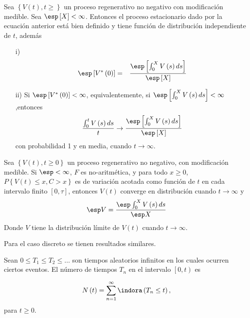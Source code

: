 \begin{Teo}
Sea $\left\{V\left(t\right),t\geq\right\}$ un proceso regenerativo no negativo con modificaci\'on medible. Sea $\esp\left[X\right]<\infty$. Entonces el proceso estacionario dado por la ecuaci\'on anterior est\'a bien definido y tiene funci\'on de distribuci\'on independiente de $t$, adem\'as
\begin{itemize}
\item[i)] \begin{eqnarray*}
\esp\left[V^{*}\left(0\right)\right]&=&\frac{\esp\left[\int_{0}^{X}V\left(s\right)ds\right]}{\esp\left[X\right]}\end{eqnarray*}
\item[ii)] Si $\esp\left[V^{*}\left(0\right)\right]<\infty$, equivalentemente, si $\esp\left[\int_{0}^{X}V\left(s\right)ds\right]<\infty$,entonces
\begin{eqnarray*}
\frac{\int_{0}^{t}V\left(s\right)ds}{t}\rightarrow\frac{\esp\left[\int_{0}^{X}V\left(s\right)ds\right]}{\esp\left[X\right]}
\end{eqnarray*}
con probabilidad 1 y en media, cuando $t\rightarrow\infty$.
\end{itemize}
\end{Teo}

\begin{Coro}
Sea $\left\{V\left(t\right),t\geq0\right\}$ un proceso regenerativo no negativo, con modificaci\'on medible. Si $\esp <\infty$, $F$ es no-aritm\'etica, y para todo $x\geq0$, $P\left\{V\left(t\right)\leq x,C>x\right\}$ es de variaci\'on acotada como funci\'on de $t$ en cada intervalo finito $\left[0,\tau\right]$, entonces $V\left(t\right)$ converge en distribuci\'on  cuando $t\rightarrow\infty$ y $$\esp V=\frac{\esp \int_{0}^{X}V\left(s\right)ds}{\esp X}$$
Donde $V$ tiene la distribuci\'on l\'imite de $V\left(t\right)$ cuando $t\rightarrow\infty$.

\end{Coro}

Para el caso discreto se tienen resultados similares.




\begin{Def}\label{Def.Tn}
Sean $0\leq T_{1}\leq T_{2}\leq \ldots$ son tiempos aleatorios infinitos en los cuales ocurren ciertos eventos. El n\'umero de tiempos $T_{n}$ en el intervalo $\left[0,t\right)$ es

\begin{eqnarray}
N\left(t\right)=\sum_{n=1}^{\infty}\indora\left(T_{n}\leq t\right),
\end{eqnarray}
para $t\geq0$.
\end{Def}


